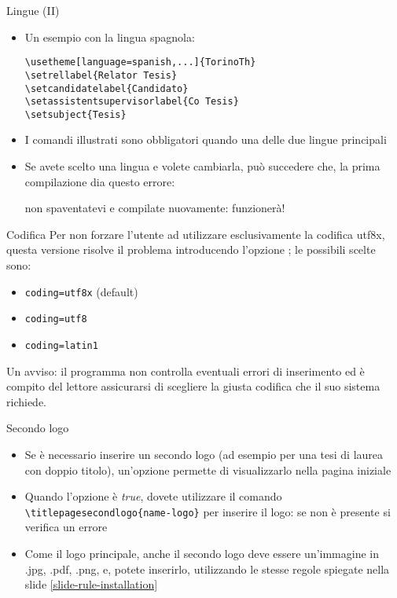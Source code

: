 \begin{frame}[t,fragile]{Lingue (II)}
\begin{itemize}
\item Un esempio con la lingua spagnola:
\begin{verbatim}
\usetheme[language=spanish,...]{TorinoTh}
\setrellabel{Relator Tesis}
\setcandidatelabel{Candidato}
\setassistentsupervisorlabel{Co Tesis}
\setsubject{Tesis}
\end{verbatim}
\item I comandi illustrati sono obbligatori quando  una delle due lingue principali
\item Se avete scelto una lingua e volete cambiarla, può succedere che, la prima compilazione dia questo errore: \begin{flushleft}
\end{flushleft}
non spaventatevi e compilate nuovamente: funzionerà!
\end{itemize}
\end{frame}

\begin{frame}[t,fragile]{Codifica}
Per non forzare l'utente ad utilizzare esclusivamente la codifica utf8x, questa versione risolve il problema introducendo l'opzione ; le possibili scelte sono:
\begin{itemize}
\item \verb!coding=utf8x! (default)
\item \verb!coding=utf8!
\item \verb!coding=latin1!
\end{itemize}
Un avviso: il programma non controlla eventuali errori di inserimento ed è compito del lettore assicurarsi di scegliere la giusta codifica che il suo sistema richiede.
\end{frame}

\begin{frame}[t,fragile]{Secondo logo}
\begin{itemize}
\item Se è necessario inserire un secondo logo (ad esempio per una tesi di laurea con doppio titolo), un'opzione permette di visualizzarlo nella pagina iniziale
\item Quando l'opzione  è \emph{true}, dovete utilizzare il comando \verb!\titlepagesecondlogo{name-logo}! per inserire il logo: se non è presente si verifica un errore
\item Come il logo principale, anche il secondo logo deve essere un'immagine in .jpg, .pdf, .png, e, potete inserirlo, utilizzando le stesse regole spiegate nella slide \ref{slide-rule-installation}
\end{itemize}
\end{frame}

